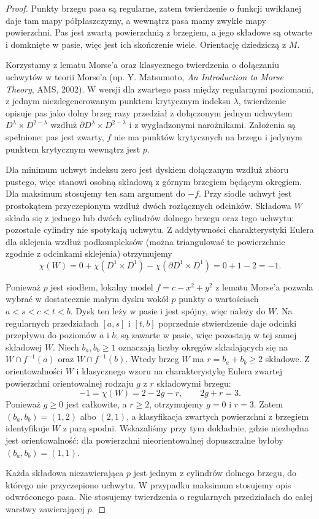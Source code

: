 \begin{proof}
Punkty brzegu pasa są regularne, zatem twierdzenie
o funkcji uwikłanej daje tam mapy półpłaszczyzny,
a wewnątrz pasa mamy zwykłe mapy powierzchni.
Pas jest zwartą powierzchnią z brzegiem, a jego
składowe są otwarte i domknięte w pasie, więc jest
ich skończenie wiele. Orientację dziedziczą z $M$.

Korzystamy z lematu Morse'a oraz klasycznego twierdzenia
o dołączaniu uchwytów w teorii Morse'a (np. Y. Matsumoto,
\emph{An Introduction to Morse Theory}, AMS, 2002).
W wersji dla zwartego pasa między regularnymi poziomami,
z jednym niezdegenerowanym punktem krytycznym indeksu
$\lambda$, twierdzenie opisuje pas jako dolny brzeg
razy przedział z dołączonym jednym uchwytem
$D^\lambda\times D^{2-\lambda}$ wzdłuż
$\partial D^\lambda\times D^{2-\lambda}$ i z
wygładzonymi narożnikami. Założenia są spełnione:
pas jest zwarty, $f$ nie ma punktów krytycznych na
brzegu i jedynym punktem krytycznym wewnątrz jest $p$.

Dla minimum uchwyt indeksu zero jest dyskiem
dołączanym wzdłuż zbioru pustego, więc stanowi osobną
składową z górnym brzegiem będącym okręgiem.
Dla maksimum stosujemy ten sam argument do $-f$.
Przy siodle uchwyt jest prostokątem przyczepionym
wzdłuż dwóch rozłącznych odcinków. Składowa $W$
składa się z jednego lub dwóch cylindrów dolnego
brzegu oraz tego uchwytu: pozostałe cylindry nie
spotykają uchwytu. Z addytywności charakterystyki
Eulera dla sklejenia wzdłuż podkompleksów (można
triangulować te powierzchnie zgodnie z odcinkami
sklejenia) otrzymujemy
\[
\chi(W)=0+\chi(D^1\times D^1)
-\chi(\partial D^1\times D^1)=0+1-2=-1.
\]

Ponieważ $p$ jest siodłem, lokalny model
$f=c-x^2+y^2$ z lematu Morse'a pozwala wybrać
w dostatecznie małym dysku wokół $p$ punkty
o wartościach $a<s<c<t<b$. Dysk ten leży w pasie
i jest spójny, więc należy do $W$.
Na regularnych przedziałach $[a,s]$ i $[t,b]$
poprzednie stwierdzenie daje odcinki przepływu
do poziomów $a$ i $b$; są zawarte w pasie, więc
pozostają w tej samej składowej $W$.
Niech $b_a,b_b\ge1$ oznaczają liczby okręgów
składających się na $W\cap f^{-1}(a)$ oraz
$W\cap f^{-1}(b)$. Wtedy brzeg $W$ ma
$r=b_a+b_b\ge2$ składowe.
Z orientowalności $W$ i klasycznego wzoru na
charakterystykę Eulera zwartej powierzchni
orientowalnej rodzaju $g$ z $r$ składowymi brzegu:
\[
-1=\chi(W)=2-2g-r,
\qquad 2g+r=3.
\]
Ponieważ $g\ge0$ jest całkowite, a $r\ge2$,
otrzymujemy $g=0$ i $r=3$.
Zatem $(b_a,b_b)=(1,2)$ albo $(2,1)$,
a klasyfikacja zwartych powierzchni z brzegiem
identyfikuje $W$ z parą spodni.
Wskazaliśmy przy tym dokładnie, gdzie
niezbędna jest orientowalność: dla powierzchni
nieorientowalnej dopuszczalne byłoby
$(b_a,b_b)=(1,1)$.

Każda składowa niezawierająca $p$ jest jednym
z cylindrów dolnego brzegu, do którego nie przyczepiono
uchwytu. W przypadku maksimum stosujemy opis
odwróconego pasa. Nie stosujemy twierdzenia o regularnych
przedziałach do całej warstwy zawierającej $p$.
\end{proof}

